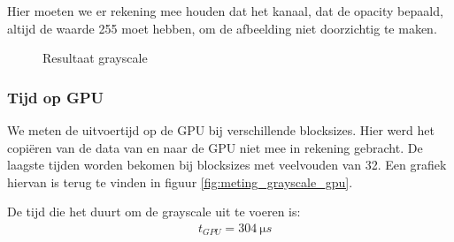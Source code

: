 \documentclass[11pt,twoside,a4paper]{article}
\begin{document}
    Hier moeten we er rekening mee houden dat het  kanaal, dat de opacity bepaald, altijd de waarde 255 moet hebben, om de afbeelding niet doorzichtig te maken.


\begin{figure}[h!]
    \centering
    \hfill
    \caption{Resultaat grayscale}
    \label{fig:grayscale}
\end{figure}


\subsubsection{Tijd op GPU}

We meten de uitvoertijd op de GPU bij verschillende blocksizes. Hier werd het copi\"eren van de data van en naar de GPU niet mee in rekening gebracht. De laagste tijden worden bekomen bij blocksizes met veelvouden van 32. Een grafiek hiervan is terug te vinden in figuur \ref{fig:meting_grayscale_gpu}.

De tijd die het duurt om de grayscale uit te voeren is:
\begin{align*}
    &t_{GPU} = \SI{304}{\micro s}
\end{align*}
\end{document}
